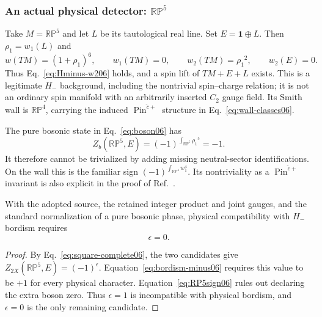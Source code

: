 \subsubsection{An actual physical detector: \texorpdfstring{$\mathbb{RP}^5$}{RP5}}
Take $M=\mathbb{RP}^5$ and let $L$ be its tautological real line. Set $E=\mathbf1\oplus L$. Then ${\rho_1}=w_1(L)$ and
\begin{equation}
 w(TM)=(1+{\rho_1})^6,\qquad w_1(TM)=0,\qquad w_2(TM)={\rho_1}^2,
 \qquad w_2(E)=0.
\end{equation}
Thus Eq.~\eqref{eq:Hminus-w206} holds, and a spin lift of $TM+E+L$ exists. This is a legitimate $H_-$ background, including the nontrivial spin--charge relation; it is not an ordinary spin manifold with an arbitrarily inserted $C_2$ gauge field. Its Smith wall is $\mathbb{RP}^4$, carrying the induced $\operatorname{Pin}^{\widetilde c+}$ structure in Eq.~\eqref{eq:wall-classes06}.

The pure bosonic state in Eq.~\eqref{eq:boson06} has
\begin{equation}\label{eq:RP5sign06}
                  Z_b(\mathbb{RP}^5,E)
                     =(-1)^{\int_{\mathbb{RP}^5}{\rho_1}^5}=-1.
\end{equation}
It therefore cannot be trivialized by adding missing neutral-sector identifications. On the wall this is the familiar sign $(-1)^{\int_{\mathbb{RP}^4}w_1^4}$. Its nontriviality as a $\operatorname{Pin}^{\widetilde c+}$ invariant is also explicit in the proof of Ref.~\cite[Proposition~6.27]{DebrayYeYu}.

\begin{theorem}\label{thm:epsilon06}
With the adopted source, the retained integer product and joint gauges, and the standard normalization of a pure bosonic phase, physical compatibility with $H_-$ bordism requires
\begin{equation}\label{eq:epsilon-selected06}
                          \boxed{\epsilon=0.}
\end{equation}
\end{theorem}
\begin{proof}
By Eq.~\eqref{eq:square-complete06}, the two candidates give
$Z_{2X}(\mathbb{RP}^5,E)=(-1)^\epsilon$. Equation~\eqref{eq:bordism-minus06} requires this value to be $+1$ for every physical character. Equation~\eqref{eq:RP5sign06} rules out declaring the extra boson zero. Thus $\epsilon=1$ is incompatible with physical bordism, and $\epsilon=0$ is the only remaining candidate.
\end{proof}

